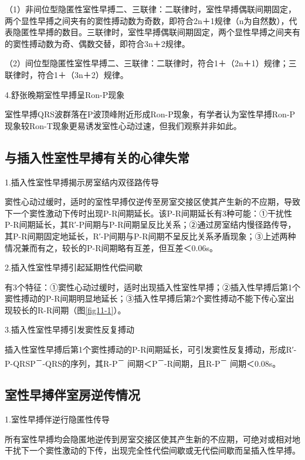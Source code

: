 （1）非间位型隐匿性室性早搏二、三联律：二联律时，室性早搏偶联间期固定，两个显性早搏之间夹有的窦性搏动数为奇数，即符合2n＋1规律（n为自然数），代表隐匿性早搏的数目。三联律时，室性早搏偶联间期固定，两个显性早搏之间夹有的窦性搏动数为奇、偶数交替，即符合3n＋2规律。

（2）间位型隐匿性室性早搏二、三联律：二联律时，符合1＋（2n＋1）规律；三联律时，符合1＋（3n＋2）规律。

4.舒张晚期室性早搏呈Ron-P现象

室性早搏QRS波群落在P波顶峰附近形成Ron-P现象，有学者认为室性早搏Ron-P现象较Ron-T现象更易诱发室性心动过速，但我们观察并非如此。

\protect\hypertarget{text00018.htmlux5cux23subid154}{}{}

\subsection{与插入性室性早搏有关的心律失常}

1.插入性室性早搏揭示房室结内双径路传导

窦性心动过缓时，适时的室性早搏仅逆传至房室交接区使其产生新的不应期，导致下一个窦性激动下传时出现P-R间期延长。该P-R间期延长有3种可能：①干扰性P-R间期延长，其R′-P间期与P-R间期呈反比关系；②通过房室结内慢径路传导，其P-R间期固定地延长，R′-P间期与P-R间期不呈反比关系矛盾现象；③上述两种情况兼而有之，较长的P-R间期略有互差，但互差＜0.06s。

2.插入性室性早搏引起延期性代偿间歇

有3个特征：①窦性心动过缓时，适时出现插入性室性早搏；②插入性早搏后第1个窦性搏动的P-R间期明显地延长；③插入性早搏后第2个窦性搏动不能下传心室出现较长的R-R间期（图\ref{fig11-1}）。

3.插入性室性早搏引发窦性反复搏动

插入性室性早搏后第1个窦性搏动的P-R间期延长，可引发窦性反复搏动，形成R′-P-QRSP\textsuperscript{－}-QRS的序列，其R-P\textsuperscript{－} 间期＜P\textsuperscript{－}-R间期，且R-P\textsuperscript{－} 间期＜0.08s。

\protect\hypertarget{text00018.htmlux5cux23subid155}{}{}

\subsection{室性早搏伴室房逆传情况}

1.室性早搏伴逆行隐匿性传导

所有室性早搏均会隐匿地逆传到房室交接区使其产生新的不应期，可绝对或相对地干扰下一个窦性激动的下传，出现完全性代偿间歇或无代偿间歇而呈插入性早搏。

